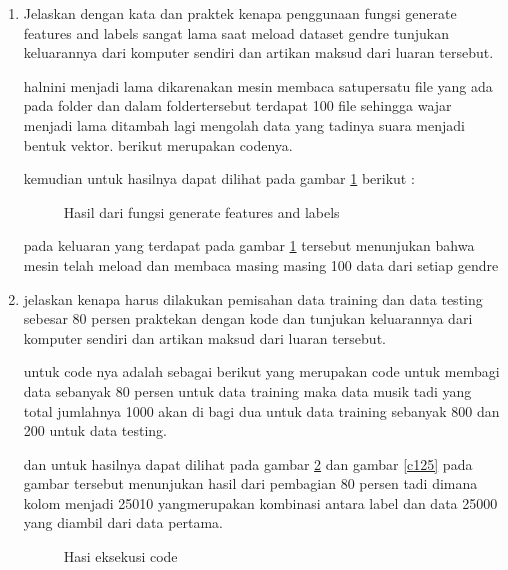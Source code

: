 \begin{enumerate}
\item Jelaskan dengan kata dan praktek kenapa penggunaan fungsi generate features and labels sangat lama saat meload dataset gendre tunjukan keluarannya dari komputer sendiri dan artikan maksud dari luaran tersebut.\par

halnini menjadi lama dikarenakan mesin membaca satupersatu file yang ada pada folder dan dalam foldertersebut terdapat 100 file sehingga wajar menjadi lama ditambah lagi mengolah data yang tadinya suara menjadi bentuk vektor. berikut merupakan codenya.

kemudian untuk hasilnya dapat dilihat pada gambar \ref{c123} berikut :

\begin{figure}[!htbp]
      \caption{Hasil dari fungsi generate features and labels}
      \label{c123}
      \end{figure}

pada keluaran yang terdapat pada gambar \ref{c123} tersebut menunjukan bahwa mesin telah meload dan membaca masing masing 100 data dari setiap gendre

\item jelaskan kenapa harus dilakukan pemisahan data training dan data testing sebesar 80 persen praktekan dengan kode dan tunjukan keluarannya dari komputer sendiri dan artikan maksud dari luaran tersebut. 

untuk code nya adalah sebagai berikut  yang merupakan code untuk membagi data sebanyak 80 persen untuk data training maka data musik tadi yang total jumlahnya 1000 akan di bagi dua untuk data training sebanyak 800  dan 200 untuk data testing.



dan untuk hasilnya dapat dilihat pada gambar \ref{c124} dan gambar \ref{c125} pada gambar tersebut menunjukan hasil dari pembagian 80 persen tadi dimana kolom menjadi 25010 yangmerupakan kombinasi antara label dan data 25000 yang diambil dari data pertama.

\begin{figure}[!htbp]
      \caption{Hasi eksekusi code}
      \label{c124}
      \end{figure}


\end{enumerate}
